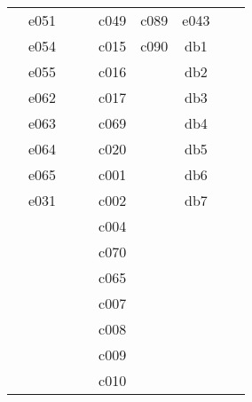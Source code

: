 \documentclass[10pt,letterpaper]{article}
\begin{document}
\begin{center}
\begin{tabular}{ |c|c|c|c|c|c|c|c|c| }
        & e051 &         &         & c049 & c089       & e043 &         &         \\
        & e054 &         &         & c015 & c090       & db1  &         &         \\
        & e055 &         &         & c016 &            & db2  &         &         \\
        & e062 &         &         & c017 &            & db3  &         &         \\
        & e063 &         &         & c069 &            & db4  &         &         \\
        & e064 &         &         & c020 &            & db5  &         &         \\
        & e065 &         &         & c001 &            & db6  &         &         \\
        & e031 &         &         & c002 &            & db7  &         &         \\
        &      &         &         & c004 &            &      &         &         \\
        &      &         &         & c070 &            &      &         &         \\
        &      &         &         & c065 &            &      &         &         \\
        &      &         &         & c007 &            &      &         &         \\
        &      &         &         & c008 &            &      &         &         \\
        &      &         &         & c009 &            &      &         &         \\
        &      &         &         & c010 &            &      &         &         \\


        \hline
        \end{tabular}
        \end{center}
\end{document}
